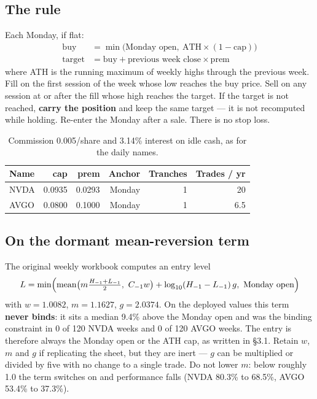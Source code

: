 \documentclass[11pt]{article}
\begin{document}
\subsection{The rule}

Each Monday, if flat:
\begin{align*}
\text{buy} &= \min\bigl(\text{Monday open},\ \text{ATH}\times(1-\text{cap})\bigr)\\
\text{target} &= \text{buy} + \text{previous week close}\times\text{prem}
\end{align*}
where ATH is the running maximum of weekly highs through the previous week. Fill on the first
session of the week whose low reaches the buy price. Sell on any session at or after the fill
whose high reaches the target. If the target is not reached, \textbf{carry the position} and keep
the same target --- it is not recomputed while holding. Re-enter the Monday after a sale.
There is no stop loss.

\begin{table}[H]\centering\small
\begin{tabular}{lrrrrr}
\toprule
\textbf{Name} & \textbf{cap} & \textbf{prem} & \textbf{Anchor} & \textbf{Tranches} &
\textbf{Trades / yr}\\
\midrule
\rowcolor{bckeep} NVDA & 0.0935 & 0.0293 & Monday & 1 & 20\\
AVGO & 0.0800 & 0.1000 & Monday & 1 & 6.5\\
\bottomrule
\end{tabular}
\caption{Commission 0.005/share and 3.14\% interest on idle cash, as for the daily names.}
\end{table}

\subsection{On the dormant mean-reversion term}

The original weekly workbook computes an entry level
\[
L=\min\Bigl(\operatorname{mean}\bigl(m\tfrac{H_{-1}+L_{-1}}{2},\ C_{-1}w\bigr)
+\log_{10}(H_{-1}-L_{-1})\,g,\ \text{Monday open}\Bigr)
\]
with $w=1.0082$, $m=1.1627$, $g=2.0374$. On the deployed values this term \textbf{never binds}:
it sits a median 9.4\% above the Monday open and was the binding constraint in 0 of 120 NVDA
weeks and 0 of 120 AVGO weeks. The entry is therefore always the Monday open or the ATH cap, as
written in \S3.1. Retain $w$, $m$ and $g$ if replicating the sheet, but they are inert ---
$g$ can be multiplied or divided by five with no change to a single trade. Do not lower $m$:
below roughly 1.0 the term switches on and performance falls (NVDA 80.3\% to 68.5\%, AVGO 53.4\%
to 37.3\%).
\end{document}
